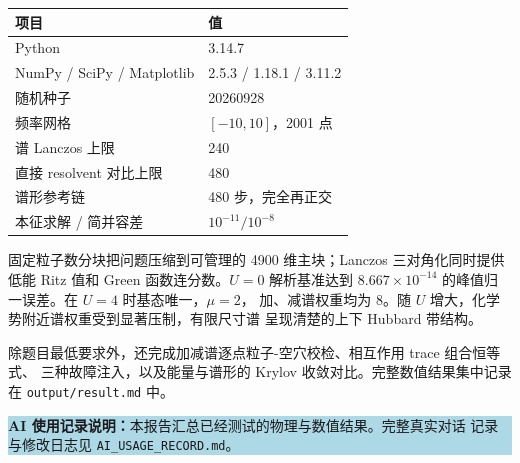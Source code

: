 \documentclass[UTF8,a4paper,11pt,fontset=windows]{ctexart}
\newcommand{\code}[1]{\texttt{#1}}
\begin{document}
\begin{table}[H]
\centering
\begin{tabular}{p{5.2cm}p{9cm}}
\toprule
项目 & 值 \\
\midrule
Python & 3.14.7 \\
NumPy / SciPy / Matplotlib & 2.5.3 / 1.18.1 / 3.11.2 \\
随机种子 & 20260928 \\
频率网格 & $[-10,10]$，2001 点 \\
谱 Lanczos 上限 & 240 \\
直接 resolvent 对比上限 & 480 \\
谱形参考链 & 480 步，完全再正交 \\
本征求解 / 简并容差 & $10^{-11}/10^{-8}$ \\
\bottomrule
\end{tabular}
\end{table}

固定粒子数分块把问题压缩到可管理的 4900 维主块；Lanczos 三对角化同时提供
低能 Ritz 值和 Green 函数连分数。$U=0$ 解析基准达到
$8.667\times10^{-14}$ 的峰值归一误差。在 $U=4$ 时基态唯一，$\mu=2$，
加、减谱权重均为 8。随 $U$ 增大，化学势附近谱权重受到显著压制，有限尺寸谱
呈现清楚的上下 Hubbard 带结构。

除题目最低要求外，还完成加减谱逐点粒子-空穴校检、相互作用 trace 组合恒等式、
三种故障注入，以及能量与谱形的 Krylov 收敛对比。完整数值结果集中记录在
\code{output/result.md} 中。

\vspace{1em}
\noindent\colorbox{lightblue}{\parbox{0.94\textwidth}{
\textbf{AI 使用记录说明：}本报告汇总已经测试的物理与数值结果。完整真实对话
记录与修改日志见 \code{AI\_USAGE\_RECORD.md}。}}
\end{document}
